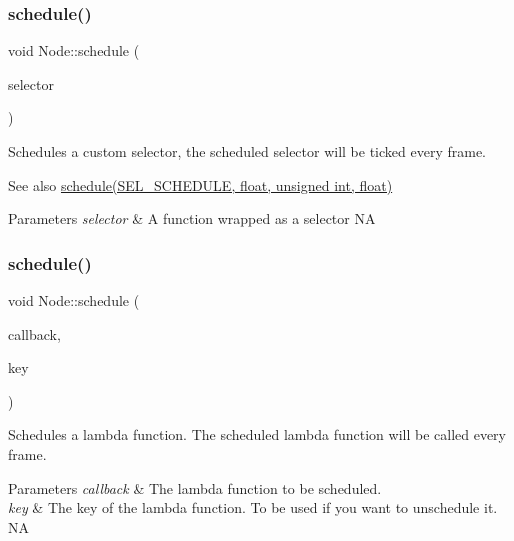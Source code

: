 \subsubsection{\texorpdfstring{schedule()}{schedule()}\hspace{0.1cm}{\footnotesize\ttfamily [5/12]}}
{\footnotesize\ttfamily void Node\+::schedule (\begin{DoxyParamCaption}\item[{S\+E\+L\+\_\+\+S\+C\+H\+E\+D\+U\+LE}]{selector }\end{DoxyParamCaption})}

Schedules a custom selector, the scheduled selector will be ticked every frame. \begin{DoxySeeAlso}{See also}
\hyperlink{classNode_a5957efe46bfe7f83f9adb5b737f7ce11}{schedule(\+S\+E\+L\+\_\+\+S\+C\+H\+E\+D\+U\+L\+E, float, unsigned int, float)}
\end{DoxySeeAlso}

\begin{DoxyParams}{Parameters}
{\em selector} & A function wrapped as a selector  NA \\
\hline
\end{DoxyParams}
\mbox{\label{classNode_a30934785a4592d0704ce952e47f69664}} 
\subsubsection{\texorpdfstring{schedule()}{schedule()}\hspace{0.1cm}{\footnotesize\ttfamily [6/12]}}
{\footnotesize\ttfamily void Node\+::schedule (\begin{DoxyParamCaption}\item[{const std\+::function$<$ void(float)$>$ \&}]{callback,  }\item[{const std\+::string \&}]{key }\end{DoxyParamCaption})}

Schedules a lambda function. The scheduled lambda function will be called every frame.


\begin{DoxyParams}{Parameters}
{\em callback} & The lambda function to be scheduled. \\
\hline
{\em key} & The key of the lambda function. To be used if you want to unschedule it.  NA \\
\hline
\end{DoxyParams}
\mbox{\label{classNode_ac48adc693c721c34a98357c088f2d97a}} 
